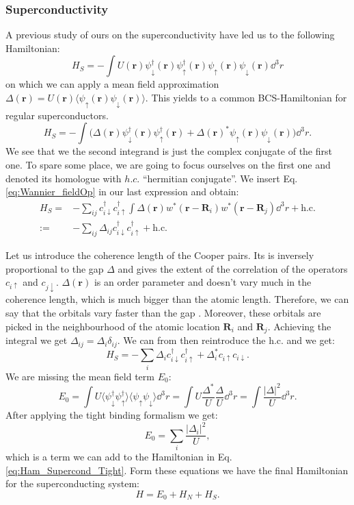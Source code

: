 \documentclass[../main.tex]{subfile}
\begin{document}
\subsubsection{Superconductivity}
A previous study of ours on the superconductivity have led us to the following Hamiltonian:
\begin{equation}\label{eq:Ham_Supercond_Tight}
    H_S = - \int U(\bm{r}) \psi_{\downarrow}^{\dagger}(\bm{r})\psi_{\uparrow}^{\dagger}(\bm{r})\psi_{\uparrow}(\bm{r})\psi_{\downarrow}(\bm{r}) \dd^3r
\end{equation}
on which we can apply a mean field approximation $\Delta(\bm{r}) = U(\bm{r})\langle \psi_{\uparrow}(\bm{r})\psi_{\downarrow}(\bm{r})\rangle$.
This yields to a common BCS-Hamiltonian for regular superconductors.\\
\[
    H_S = - \int \biggl(\Delta(\bm{r}) \psi_{\downarrow}^{\dagger}(\bm{r})\psi_{\uparrow}^{\dagger}(\bm{r}) +
     \Delta(\bm{r})^{\ast}\psi_{\uparrow}(\bm{r})\psi_{\downarrow}(\bm{r})\biggr) \dd^3r.
\]  
We see that we the second integrand is just the complex conjugate of the first one. 
To spare some place, we are going to focus ourselves on the first one and denoted its homologue with $h.c.$ ``hermitian conjugate''. We insert Eq. \ref{eq:Wannier_fieldOp} 
in our last expression and obtain:
\begin{align*}
    H_S =& - \sum_{ij} c_{i\downarrow}^{\dagger}c_{i\uparrow}^{\dagger} \int \Delta(\bm{r}) w^{\ast}(\bm{r} - \bm{R}_i) w^{\ast}(\bm{r} - \bm{R}_j) \dd^3r + \text{h.c.}\\
    :=& -\sum_{ij} \Delta_{ij} c_{i\downarrow}^{\dagger}c_{i\uparrow}^{\dagger} + \text{h.c.}
\end{align*}

Let us introduce the coherence length of the Cooper pairs. Its is inversely proportional to the gap $\Delta$ and gives the extent of the correlation of the operators $c_{i\uparrow}$ and $c_{j\downarrow}$.
$\Delta(\bm{r})$ is an order parameter and doesn't vary much in the coherence length, which is much bigger than the atomic length.
Therefore, we can say that the orbitals vary faster than the gap \cite{Jabir2021}. Moreover, these orbitals are picked in the neighbourhood of the atomic location $\bm{R}_i$ and $\bm{R}_j$.
Achieving the integral we get $\Delta_{ij} = \Delta_i \delta_{ij}$. We can from then reintroduce the h.c. and we get:
\begin{equation}\label{eq:Ham_Superc    ond_Tight}
    H_S = -\sum_{i} \Delta_i c_{i\downarrow}^{\dagger}c_{i\uparrow}^{\dagger} + \Delta_i^{\ast} c_{i\uparrow}c_{i\downarrow}.
\end{equation}
We are missing the mean field term $E_0$:
\[
    E_0 = \int U \langle \psi_{\downarrow}^{\dagger}\psi_{\uparrow}^{\dagger}\rangle \langle\psi_{\uparrow}\psi_{\downarrow}\rangle \dd^3r 
    = \int U \frac{\Delta^{\ast}}{U}\frac{\Delta}{U} \dd^3r = \int \frac{|\Delta|^2}{U} \dd^3r.
\]
After applying the tight binding formalism we get:
\[
    E_0 = \sum_{i} \frac{|\Delta_i|^2}{U},
\]
which is a term we can add to the Hamiltonian in Eq. \ref{eq:Ham_Supercond_Tight}. Form these equations we have the final 
Hamiltonian for the superconducting system:
\[
    H = E_0 + H_N + H_S.
\]  
\end{document}
